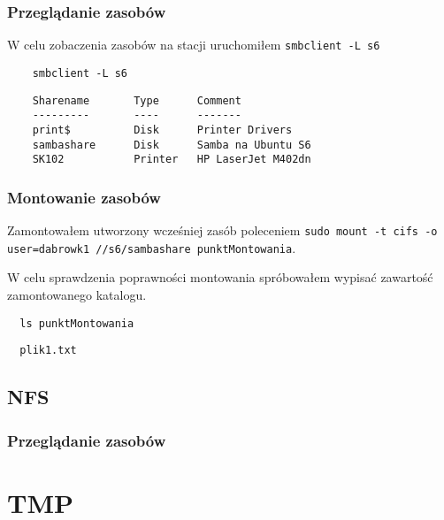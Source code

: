 \documentclass{article} %
\begin{document}
\subsubsection{Przeglądanie zasobów}
W celu zobaczenia zasobów na stacji uruchomiłem \texttt{smbclient -L s6}
\begin{tcolorbox}[colback=yellow!10!white,colframe=red!45!black,coltitle=yellow!100!black, title=Ubuntu]
  \begin{lstlisting}
    smbclient -L s6
  \end{lstlisting}
  \tcblower
  \footnotesize
  \begin{lstlisting}
    Sharename       Type      Comment
    ---------       ----      -------
    print$          Disk      Printer Drivers
    sambashare      Disk      Samba na Ubuntu S6
    SK102           Printer   HP LaserJet M402dn
  \end{lstlisting}
\end{tcolorbox}
\normalsize

\subsubsection{Montowanie zasobów}
Zamontowałem utworzony wcześniej zasób poleceniem \texttt{sudo mount -t cifs -o user=dabrowk1 //s6/sambashare punktMontowania}.

W celu sprawdzenia poprawności montowania spróbowałem wypisać zawartość zamontowanego katalogu.
\begin{tcolorbox}[colback=yellow!10!white,colframe=red!45!black,coltitle=yellow!100!black, title=Ubuntu]
  \begin{lstlisting}
  ls punktMontowania
  \end{lstlisting}
  \tcblower
  \footnotesize
  \begin{lstlisting}
  plik1.txt
  \end{lstlisting}
\end{tcolorbox}
\normalsize

\subsection{NFS}

\subsubsection{Przeglądanie zasobów}


\section{TMP}
\end{document}
